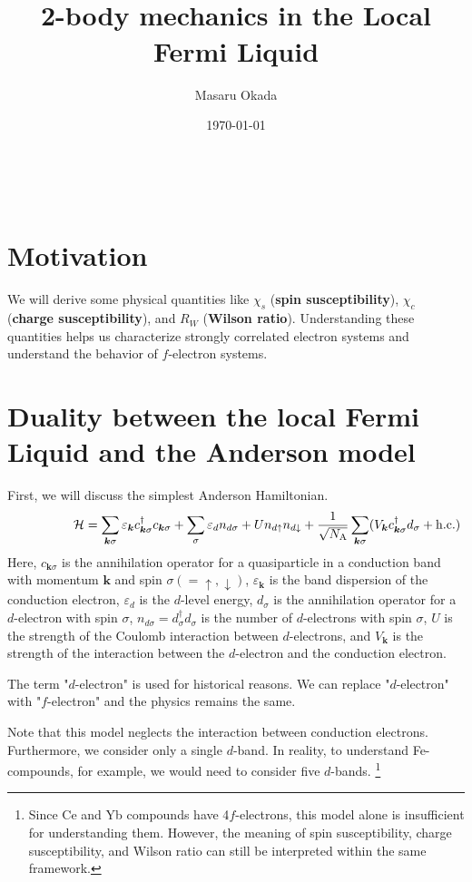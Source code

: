 \documentclass[a4j]{jarticle}
\title{\ \\[-35mm] 2-body mechanics in the Local Fermi Liquid
}
\author{ Masaru Okada}
\date{\today}
\begin{document}
\allowdisplaybreaks
\maketitle

\ \\[-20mm]

\section*{Motivation}


We will derive some physical quantities like $\chi_{s}$ (\textbf{spin susceptibility}), $\chi_{c}$ (\textbf{charge susceptibility}), and $R_{W}$ (\textbf{Wilson ratio}).
Understanding these quantities helps us characterize strongly correlated electron systems and understand the behavior of $f$-electron systems.


\section*{Duality between the local Fermi Liquid and the Anderson model}
First, we will discuss the simplest Anderson Hamiltonian.
\begin{align}
	\hspace{17.3mm}
	\mathcal{H}
	=
	\sum_{\bm{k}\sigma}
	\varepsilon_{\bm{k}}
	c^{\dagger}_{\bm{k} \sigma}
	c_{\bm{k} \sigma}
	+
	\sum_{\sigma}
	\varepsilon_{d}
	n_{d \sigma}
	+
	U
	n_{d \uparrow}
	n_{d \downarrow}
	+
	\frac{1}{\sqrt{N_{\rm A}}}
	\sum_{\bm{k}\sigma}
	(
	V_{\bm{k}}
	c_{\bm{k}\sigma}^{\dagger}
	d_{\sigma}
	+
	{\rm h.c.}
	)
\end{align}
Here, $c_{\bm{k}\sigma}$ is the annihilation operator for a quasiparticle in a conduction band with momentum $\bm{k}$ and spin $\sigma(=\uparrow,\downarrow)$, $\varepsilon_{\bm{k}}$ is the band dispersion of the conduction electron, $\varepsilon_{d}$ is the $d$-level energy, $d_{\sigma}$ is the annihilation operator for a $d$-electron with spin $\sigma$, $n_{d \sigma}=d_{\sigma}^{\dagger} d_{\sigma}$ is the number of $d$-electrons with spin $\sigma$, $U$ is the strength of the Coulomb interaction between $d$-electrons, and $V_{\bm{k}}$ is the strength of the interaction between the $d$-electron and the conduction electron.

The term "$d$-electron" is used for historical reasons.
We can replace "$d$-electron" with "$f$-electron" and the physics remains the same.

Note that this model neglects the interaction between conduction electrons.
Furthermore, we consider only a single $d$-band.
In reality, to understand Fe-compounds, for example, we would need to consider five $d$-bands.
\footnote{
	Since Ce and Yb compounds have 4$f$-electrons, this model alone is insufficient for understanding them.
	However, the meaning of spin susceptibility, charge susceptibility, and Wilson ratio can still be interpreted within the same framework.
}
\end{document}
